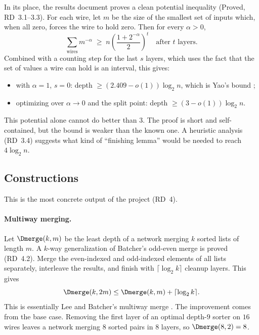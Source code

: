 In its place, the results document proves a clean potential inequality (Proved, RD~3.1--3.3). For each wire, let $m$ be the size of the smallest set of inputs which, when all zero, forces the wire to hold zero. Then for every $\alpha > 0$,
\[
\sum_{\text{wires}} m^{-\alpha} \;\ge\; n\left(\frac{1 + 2^{-\alpha}}{2}\right)^{t} \quad \text{after } t \text{ layers}.
\]
Combined with a counting step for the last $s$ layers, which uses the fact that the set of values a wire can hold is an interval, this gives:
\begin{itemize}
    \item with $\alpha = 1$, $s = 0$: depth $\ge (2.409 - o(1))\log_2 n$, which is Yao's bound \cite{yao1980bounds};
    \item optimizing over $\alpha \to 0$ and the split point: depth $\ge (3 - o(1))\log_2 n$.
\end{itemize}
This potential alone cannot do better than $3$. The proof is short and self-contained, but the bound is weaker than the known one. A heuristic analysis (RD~3.4) suggests what kind of ``finishing lemma'' would be needed to reach $4 \log_2 n$.

\subsection{Constructions}\label{sec:constructions}

This is the most concrete output of the project (RD~4).

\paragraph{Multiway merging.} Let $\Dmerge(k,m)$ be the least depth of a network merging $k$ sorted lists of length $m$. A $k$-way generalization of Batcher's odd-even merge is proved (RD~4.2). Merge the even-indexed and odd-indexed elements of all lists separately, interleave the results, and finish with $\lceil \log_2 k \rceil$ cleanup layers. This gives
\[
\Dmerge(k, 2m) \le \Dmerge(k, m) + \lceil \log_2 k \rceil.
\]
This is essentially Lee and Batcher's multiway merge \cite{lee1995multiway}. The improvement comes from the base case. Removing the first layer of an optimal depth-$9$ sorter on $16$ wires leaves a network merging $8$ sorted pairs in $8$ layers, so $\Dmerge(8,2) = 8$.

